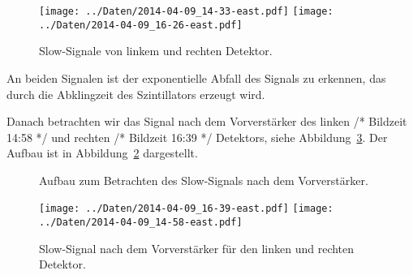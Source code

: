 \begin{figure}[htbp]
    \centering
    \texttt{[image: ../Daten/2014-04-09\_14-33-east.pdf]}
    \hfill
    \texttt{[image: ../Daten/2014-04-09\_16-26-east.pdf]}
    \caption{%
        Slow-Signale von linkem und rechten Detektor.
    }
    \label{fig:slow_signal}
\end{figure}

An beiden Signalen ist der exponentielle Abfall des Signals zu erkennen, das
durch die Abklingzeit des Szintillators erzeugt wird.

Danach betrachten wir das Signal nach dem Vorverstärker des linken /* Bildzeit
14:58 */ und rechten /* Bildzeit 16:39 */ Detektors, siehe
Abbildung~\ref{fig:slow_pre_amp}. Der Aufbau ist in
Abbildung~\ref{fig:aufbau:slow_pre} dargestellt.

\begin{figure}[htbp]
    \centering
    \caption{%
        Aufbau zum Betrachten des Slow-Signals nach dem Vorverstärker.
    }
    \label{fig:aufbau:slow_pre}
\end{figure}

\begin{figure}[htbp]
    \centering
    \texttt{[image: ../Daten/2014-04-09\_16-39-east.pdf]}
    \hfill
    \texttt{[image: ../Daten/2014-04-09\_14-58-east.pdf]}
    \caption{%
        Slow-Signal nach dem Vorverstärker für den linken und rechten Detektor.
    }
    \label{fig:slow_pre_amp}
\end{figure}

